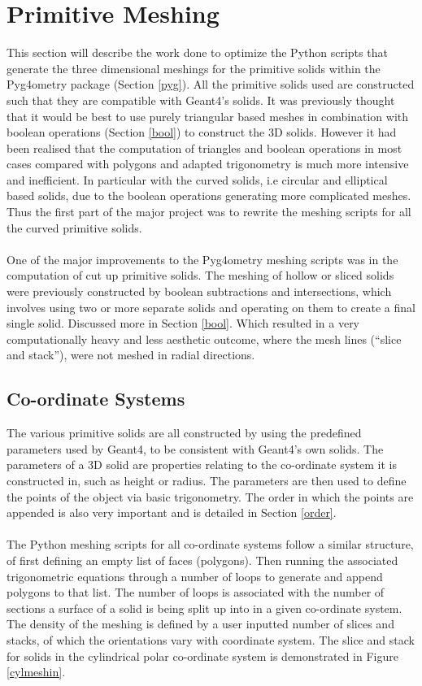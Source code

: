 \documentclass[12pt,a4paper]{article}
\begin{document}
\newpage
\section{Primitive Meshing}
\label{prim}
This section will describe the work done to optimize the Python scripts that generate the three dimensional meshings for the primitive solids within the Pyg4ometry package (Section \ref{pyg}). All the primitive solids used are constructed such that they are compatible with Geant4's solids. It was previously thought that it would be best to use purely triangular based meshes in combination with boolean operations (Section \ref{bool}) to construct the 3D solids. However it had been realised that the computation of triangles and boolean operations in most cases compared with polygons and adapted trigonometry is much more intensive and inefficient. In particular with the curved solids, i.e circular and elliptical based solids, due to the boolean operations generating more complicated meshes. Thus the first part of the major project was to rewrite the meshing scripts for all the curved primitive solids.
\\\\
One of the major improvements to the Pyg4ometry meshing scripts was in the computation of cut up primitive solids. The meshing of hollow or sliced solids were previously constructed by boolean subtractions and intersections, which involves using two or more separate solids and operating on them to create a final single solid. Discussed more in Section \ref{bool}. Which resulted in a very computationally heavy and less aesthetic outcome, where the mesh lines (``slice and stack''), were not meshed in radial directions.

\subsection{Co-ordinate Systems}
\label{cosy}
The various primitive solids are all constructed by using the predefined parameters used by Geant4, to be consistent with Geant4's own solids. The parameters of a 3D solid are properties relating to the co-ordinate system it is constructed in, such as height or radius. The parameters are then used to define the points of the object via basic trigonometry. The order in which the points are appended is also very important and is detailed in Section \ref{order}.
\\\\
The Python meshing scripts for all co-ordinate systems follow a similar structure, of first defining an empty list of faces (polygons). Then running the associated trigonometric equations through a number of loops to generate and append polygons to that list. The number of loops is associated with the number of sections a surface of a solid is being split up into in a given co-ordinate system. The density of the meshing is defined by a user inputted number of slices and stacks, of which the orientations vary with coordinate system. The slice and stack for solids in the cylindrical polar co-ordinate system is demonstrated in Figure \ref{cylmeshin}.
\end{document}
